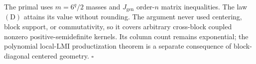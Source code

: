 The primal uses \(m=6^q/2\) masses and \(J_{\mathrm{gen}}\) order-\(n\) matrix inequalities.  The law \((\mathrm D)\) attains its value without rounding.  The argument never used centering, block support, or commutativity, so it covers arbitrary cross-block coupled nonzero positive-semidefinite kernels.  Its column count remains exponential; the polynomial local-LMI productization theorem is a separate consequence of block-diagonal centered geometry.  \(\square\)